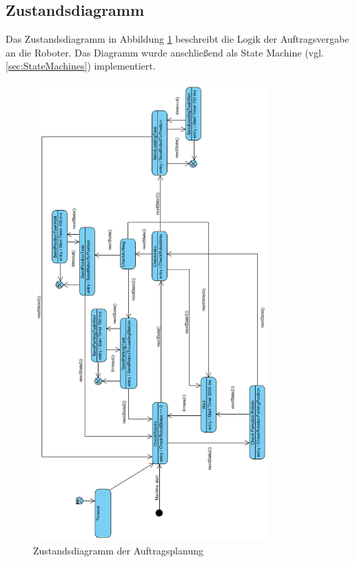 \subsection{Zustandsdiagramm}

Das Zustandsdiagramm in Abbildung \ref{fig:Auftragsplanung} beschreibt die Logik der Auftragsvergabe an die Roboter. Das Diagramm wurde anschließend als State Machine (vgl. \ref{sec:StateMachines}) implementiert. 

\begin{figure}[!htb]
    \centering
    \includegraphics[width=0.8\textwidth]{Abbildungen/Auftragsplanung_rotated.PNG}
    \caption{Zustandsdiagramm der Auftragsplanung}		
    \label{fig:Auftragsplanung}
\end{figure}

